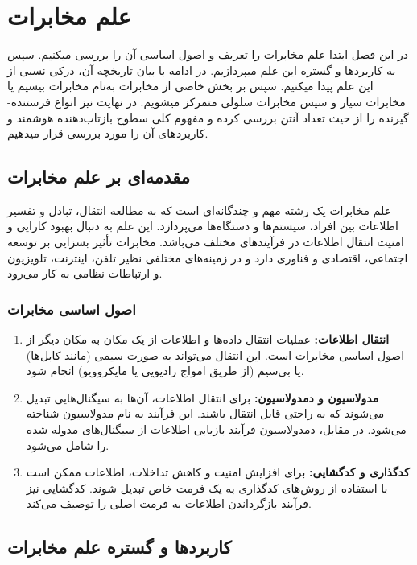 \chapter{علم مخابرات}
در این فصل ابتدا علم مخابرات را تعریف و اصول اساسی آن را بررسی میکنیم. سپس به کاربردها و گستره این علم میپردازیم. در ادامه با بیان تاریخچه آن، درکی نسبی از این علم پیدا میکنیم. سپس بر بخش خاصی از مخابرات به‌نام مخابرات بیسیم یا مخابرات سیار و سپس مخابرات سلولی متمرکز میشویم. در نهایت نیز انواع فرستنده-گیرنده را از حیث تعداد آنتن بررسی کرده و مفهوم کلی سطوح بازتاب‌دهنده هوشمند و کاربردهای آن را مورد بررسی قرار میدهیم.
\newpage
\section{مقدمه‌ای بر علم مخابرات}
علم مخابرات یک رشته مهم و چندگانه‌ای است که به مطالعه انتقال، تبادل و تفسیر اطلاعات بین افراد، سیستم‌ها و دستگاه‌ها می‌پردازد. این علم به دنبال بهبود کارایی و امنیت انتقال اطلاعات در فرآیندهای مختلف می‌باشد. مخابرات تأثیر بسزایی بر توسعه اجتماعی، اقتصادی و فناوری دارد و در زمینه‌های مختلفی نظیر تلفن، اینترنت، تلویزیون و ارتباطات نظامی به کار می‌رود.

\subsection{
	اصول اساسی مخابرات
}
\begin{enumerate}
	\item \textbf{
		انتقال اطلاعات:
	}
	 عملیات انتقال داده‌ها و اطلاعات از یک مکان به مکان دیگر از اصول اساسی مخابرات است. این انتقال می‌تواند به صورت سیمی (مانند کابل‌ها) یا بی‌سیم (از طریق امواج رادیویی یا مایکروویو) انجام شود.
	
	\item \textbf{مدولاسیون و دمدولاسیون:} برای انتقال اطلاعات، آن‌ها به سیگنال‌هایی تبدیل می‌شوند که به راحتی قابل انتقال باشند. این فرآیند به نام مدولاسیون شناخته می‌شود. در مقابل، دمدولاسیون فرآیند بازیابی اطلاعات از سیگنال‌های مدوله شده را شامل می‌شود.
	
	\item \textbf{کدگذاری و کدگشایی:} برای افزایش امنیت و کاهش تداخلات، اطلاعات ممکن است با استفاده از روش‌های کدگذاری به یک فرمت خاص تبدیل شوند. کدگشایی نیز فرآیند بازگرداندن اطلاعات به فرمت اصلی را توصیف می‌کند.
\end{enumerate}

\section{کاربردها و گستره علم مخابرات}
